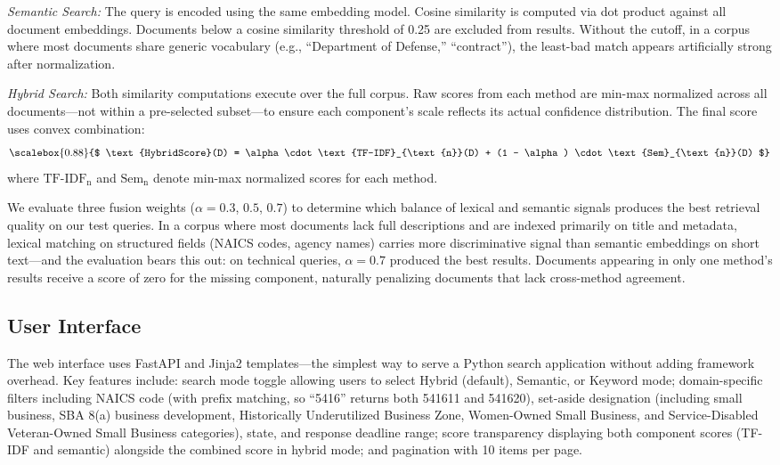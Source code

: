 \documentclass[10pt,twocolumn]{article}
\begin{document}
\textit{Semantic Search:} The query is encoded using the same embedding model. Cosine similarity is computed via dot product against all document embeddings. Documents below a cosine similarity threshold of 0.25 are excluded from results. Without the cutoff, in a corpus where most documents share generic vocabulary (e.g., ``Department of Defense,'' ``contract''), the least-bad match appears artificially strong after normalization.

\textit{Hybrid Search:} Both similarity computations execute over the full corpus. Raw scores from each method are min-max normalized across all documents---not within a pre-selected subset---to ensure each component's scale reflects its actual confidence distribution. The final score uses convex combination:
\begin{equation}
\scalebox{0.88}{$
\text{HybridScore}(D) = \alpha \cdot \text{TF-IDF}_{\text{n}}(D) + (1 - \alpha) \cdot \text{Sem}_{\text{n}}(D)
$}
\end{equation}
where $\text{TF-IDF}_{\text{n}}$ and $\text{Sem}_{\text{n}}$ denote min-max normalized scores for each method.

We evaluate three fusion weights ($\alpha = 0.3$, $0.5$, $0.7$) to determine which balance of lexical and semantic signals produces the best retrieval quality on our test queries. In a corpus where most documents lack full descriptions and are indexed primarily on title and metadata, lexical matching on structured fields (NAICS codes, agency names) carries more discriminative signal than semantic embeddings on short text---and the evaluation bears this out: on technical queries, $\alpha = 0.7$ produced the best results. Documents appearing in only one method's results receive a score of zero for the missing component, naturally penalizing documents that lack cross-method agreement.

\subsection{User Interface}

The web interface uses FastAPI and Jinja2 templates---the simplest way to serve a Python search application without adding framework overhead. Key features include: search mode toggle allowing users to select Hybrid (default), Semantic, or Keyword mode; domain-specific filters including NAICS code (with prefix matching, so ``5416'' returns both 541611 and 541620), set-aside designation (including small business, SBA 8(a) business development, Historically Underutilized Business Zone, Women-Owned Small Business, and Service-Disabled Veteran-Owned Small Business categories), state, and response deadline range; score transparency displaying both component scores (TF-IDF and semantic) alongside the combined score in hybrid mode; and pagination with 10 items per page.
\end{document}
